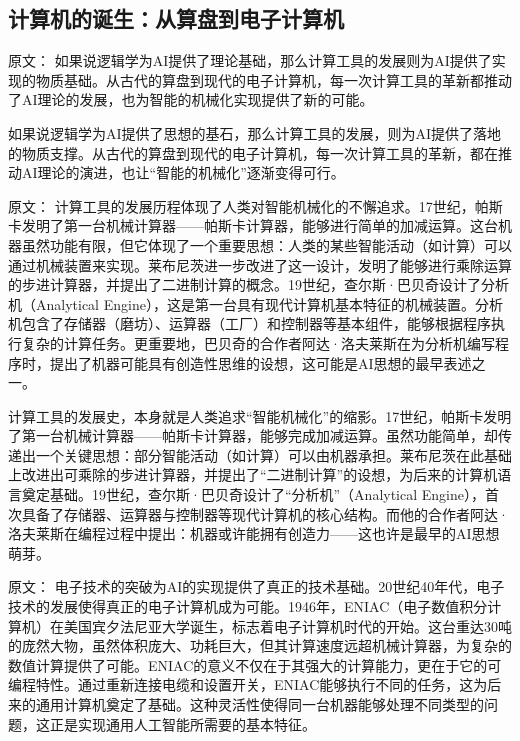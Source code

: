 \subsection{计算机的诞生：从算盘到电子计算机}

原文：
如果说逻辑学为AI提供了理论基础，那么计算工具的发展则为AI提供了实现的物质基础。从古代的算盘到现代的电子计算机，每一次计算工具的革新都推动了AI理论的发展，也为智能的机械化实现提供了新的可能。

如果说逻辑学为AI提供了思想的基石，那么计算工具的发展，则为AI提供了落地的物质支撑。从古代的算盘到现代的电子计算机，每一次计算工具的革新，都在推动AI理论的演进，也让“智能的机械化”逐渐变得可行。

原文：
计算工具的发展历程体现了人类对智能机械化的不懈追求。17世纪，帕斯卡发明了第一台机械计算器——帕斯卡计算器，能够进行简单的加减运算。这台机器虽然功能有限，但它体现了一个重要思想：人类的某些智能活动（如计算）可以通过机械装置来实现。莱布尼茨进一步改进了这一设计，发明了能够进行乘除运算的步进计算器，并提出了二进制计算的概念。19世纪，查尔斯·巴贝奇设计了分析机（Analytical Engine），这是第一台具有现代计算机基本特征的机械装置。分析机包含了存储器（磨坊）、运算器（工厂）和控制器等基本组件，能够根据程序执行复杂的计算任务。更重要地，巴贝奇的合作者阿达·洛夫莱斯在为分析机编写程序时，提出了机器可能具有创造性思维的设想，这可能是AI思想的最早表述之一。

计算工具的发展史，本身就是人类追求“智能机械化”的缩影。17世纪，帕斯卡发明了第一台机械计算器——帕斯卡计算器，能够完成加减运算。虽然功能简单，却传递出一个关键思想：部分智能活动（如计算）可以由机器承担。莱布尼茨在此基础上改进出可乘除的步进计算器，并提出了“二进制计算”的设想，为后来的计算机语言奠定基础。19世纪，查尔斯·巴贝奇设计了“分析机”（Analytical Engine），首次具备了存储器、运算器与控制器等现代计算机的核心结构。而他的合作者阿达·洛夫莱斯在编程过程中提出：机器或许能拥有创造力——这也许是最早的AI思想萌芽。

原文：
电子技术的突破为AI的实现提供了真正的技术基础。20世纪40年代，电子技术的发展使得真正的电子计算机成为可能。1946年，ENIAC（电子数值积分计算机）在美国宾夕法尼亚大学诞生，标志着电子计算机时代的开始。这台重达30吨的庞然大物，虽然体积庞大、功耗巨大，但其计算速度远超机械计算器，为复杂的数值计算提供了可能。ENIAC的意义不仅在于其强大的计算能力，更在于它的可编程特性。通过重新连接电缆和设置开关，ENIAC能够执行不同的任务，这为后来的通用计算机奠定了基础。这种灵活性使得同一台机器能够处理不同类型的问题，这正是实现通用人工智能所需要的基本特征。

